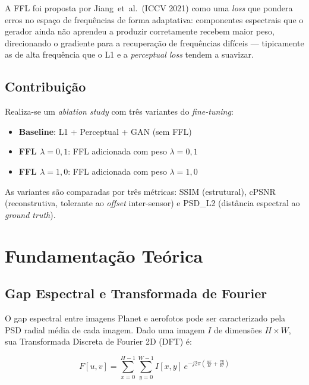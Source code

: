 \documentclass[12pt, a4paper]{article}
\begin{document}
A FFL foi proposta por Jiang~et~al.\ (ICCV 2021) como uma \textit{loss} que
pondera erros no espaço de frequências de forma adaptativa: componentes espectrais
que o gerador ainda não aprendeu a produzir corretamente recebem maior peso,
direcionando o gradiente para a recuperação de frequências difíceis --- tipicamente
as de alta frequência que o L1 e a \textit{perceptual loss} tendem a suavizar.

\subsection*{Contribuição}

Realiza-se um \textit{ablation study} com três variantes do \textit{fine-tuning}:

\begin{itemize}
    \item \textbf{Baseline}: L1 + Perceptual + GAN (sem FFL)
    \item \textbf{FFL $\lambda=0{,}1$}: FFL adicionada com peso $\lambda=0{,}1$
    \item \textbf{FFL $\lambda=1{,}0$}: FFL adicionada com peso $\lambda=1{,}0$
\end{itemize}

As variantes são comparadas por três métricas: SSIM (estrutural), cPSNR
(reconstrutiva, tolerante ao \textit{offset} inter-sensor) e PSD\_L2 (distância
espectral ao \textit{ground truth}).

\section{Fundamentação Teórica}

\subsection{Gap Espectral e Transformada de Fourier}

O gap espectral entre imagens Planet e aerofotos pode ser caracterizado pela
PSD radial média de cada imagem. Dado uma imagem $I$ de dimensões $H \times W$,
sua Transformada Discreta de Fourier 2D (DFT) é:

\begin{equation}
    F[u,v] = \sum_{x=0}^{H-1} \sum_{y=0}^{W-1} I[x,y]\, e^{-j2\pi\left(\frac{ux}{H} + \frac{vy}{W}\right)}
\end{equation}
\end{document}
